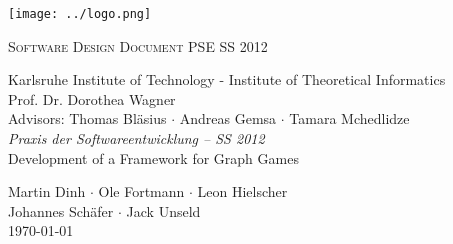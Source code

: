\begin{titlepage}
\begin{center}

\begin{minipage}{1\linewidth}
	\vspace{2cm}
	\texttt{[image: ../logo.png]}
	\vspace{2cm}
\end{minipage}
	
\fontsize{40}{50}\selectfont
        \textsc{Software Design Document}
        \vfill
\Large
PSE SS 2012
  \vfill
 \newpage
 
 \null
 \vfill
 \fontsize{12}{16}\selectfont
 Karlsruhe Institute of Technology - Institute of Theoretical Informatics \\
 Prof. Dr. Dorothea Wagner \\
 \vspace{.5cm}
 Advisors: Thomas Bläsius $\cdot$ Andreas Gemsa $\cdot$ Tamara Mchedlidze \\
 
 \vspace{2cm}
 \Large
 \emph{Praxis der Softwareentwicklung -- SS 2012} \\
 Development of a Framework for Graph Games \\
  \medskip
  \vspace{2cm}
  
    Martin Dinh $\cdot$ Ole Fortmann $\cdot$ Leon Hielscher \\ Johannes Schäfer $\cdot$ Jack Unseld
  \vspace{2cm} \\
  \today
\end{center}

  \vfill

\end{titlepage}
